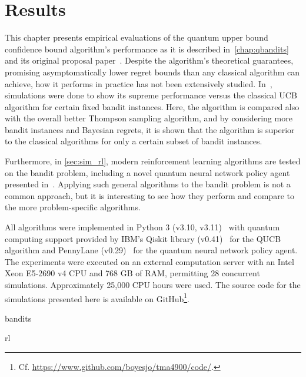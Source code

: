 \chapter{Results}
\label{chap:simulations}

This chapter presents empirical evaluations of the quantum upper bound confidence bound algorithm's performance as it is described in~\cref{chap:qbandits} and its original proposal paper~\autocite{wan2022}.
Despite the algorithm's theoretical guarantees, promising asymptomatically lower regret bounds than any classical algorithm can achieve, how it performs in practice has not been extensively studied.
In~\autocite{wan2022}, simulations were done to show its supreme performance versus the classical UCB algorithm for certain fixed bandit instances.
Here, the algorithm is compared also with the overall better Thompson sampling algorithm, and by considering more bandit instances and Bayesian regrets, it is shown that the algorithm is superior to the classical algorithms for only a certain subset of bandit instances.

Furthermore, in \cref{sec:sim_rl}, modern reinforcement learning algorithms are tested on the bandit problem, including a novel quantum neural network policy agent presented in~\autocite{jerbi2021a}.
Applying such general algorithms to the bandit problem is not a common approach, but it is interesting to see how they perform and compare to the more problem-specific algorithms.

All algorithms were implemented in Python 3 (v3.10, v3.11)~\autocite{python} with quantum computing support provided by IBM's Qiskit library (v0.41)~\autocite{qiskit} for the QUCB algorithm and PennyLane (v0.29)~\autocite{pennylane} for the quantum neural network policy agent.
The experiments were executed on an external computation server with an Intel Xeon E5-2690 v4 CPU and 768 GB of RAM, permitting 28 concurrent simulations.
Approximately 25,000 CPU hours were used.
The source code for the simulations presented here is available on GitHub\footnote{
    Cf. \url{https://www.github.com/boyesjo/tma4900/code/}.
}.


{bandits}
\clearpage



{rl}

\clearpage
